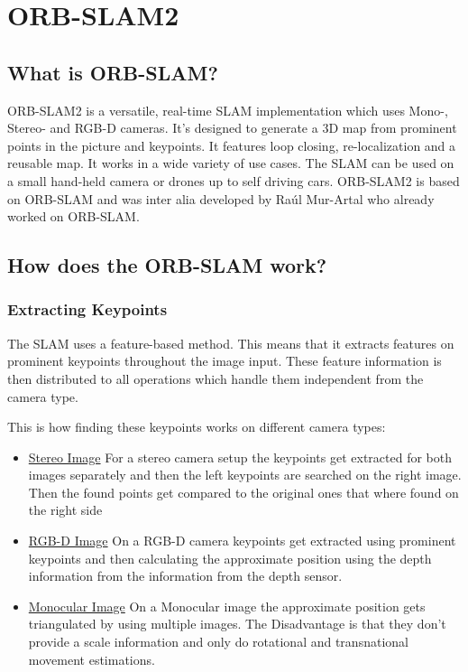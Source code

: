 
\chapter{ORB-SLAM2\authorA}

\section{What is ORB-SLAM?}
ORB-SLAM2 is a versatile, real-time SLAM implementation which uses Mono-, Stereo- and RGB-D cameras. It's designed to generate a 3D map from prominent points in the picture and keypoints. It features loop closing, re-localization and a reusable map.\cite{orbslam2} It works in a wide variety of use cases. The SLAM can be used on a small hand-held camera or drones up to self driving cars.
ORB-SLAM2 is based on ORB-SLAM and was inter alia developed by Raúl Mur-Artal who already worked on ORB-SLAM.

\section{How does the ORB-SLAM work?}

\subsection{Extracting Keypoints}
The SLAM uses a feature-based method. This means that it extracts features on prominent keypoints throughout the image input. These feature information is then distributed to all operations which handle them independent from the camera type. \cite{orbslam2} \newline\newline


This is how finding these keypoints works on different camera types:
\begin{itemize}
    \item \underline{Stereo Image} \newline
    For a stereo camera setup the keypoints get extracted for both images separately and then the left keypoints are searched on the right image. Then the found points get compared to the original ones that where found on the right side
    \item \underline{RGB-D Image} \newline
    On a RGB-D camera keypoints get extracted using prominent keypoints and then calculating the approximate position using the depth information from the information from the depth sensor.
    \item \underline{Monocular Image} \newline
    On a Monocular image the approximate position gets triangulated by using multiple images. The Disadvantage is that they don't provide a scale information and only do rotational and transnational movement estimations.
\end{itemize}

